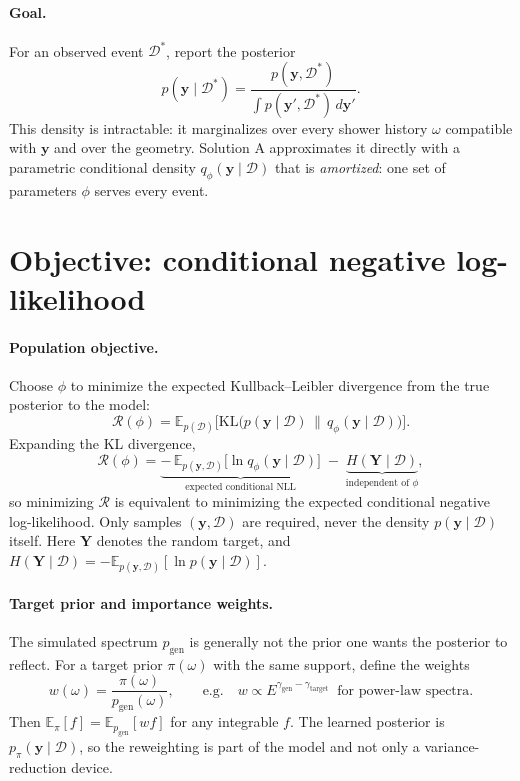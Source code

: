 \documentclass[11pt]{article}
\theoremstyle{definition}
\newcommand{\D}{\mathcal{D}}
\newcommand{\y}{\bm{y}}
\newcommand{\Y}{\bm{Y}}
\newcommand{\E}{\mathbb{E}}
\newcommand{\KL}{\mathrm{KL}}
\begin{document}
\paragraph{Goal.}
For an observed event $\D^\ast$, report the posterior
\begin{equation}
  p(\y\mid\D^\ast) = \frac{p(\y,\D^\ast)}{\int p(\y',\D^\ast)\,d\y'} .
\end{equation}
This density is intractable: it marginalizes over every shower history $\omega$ compatible
with $\y$ and over the geometry. Solution A approximates it directly with a parametric
conditional density $q_\phi(\y\mid\D)$ that is \emph{amortized}: one set of parameters $\phi$
serves every event.

\section{Objective: conditional negative log-likelihood}

\paragraph{Population objective.}
Choose $\phi$ to minimize the expected Kullback--Leibler divergence from the true posterior
to the model:
\begin{equation}
  \mathcal{R}(\phi) = \E_{p(\D)}\Big[\KL\big(p(\y\mid\D)\,\big\|\,q_\phi(\y\mid\D)\big)\Big].
\end{equation}
Expanding the KL divergence,
\begin{equation}
  \mathcal{R}(\phi)
  = \underbrace{-\,\E_{p(\y,\D)}\big[\ln q_\phi(\y\mid\D)\big]}_{\text{expected conditional NLL}}
  \;-\;\underbrace{H(\Y\mid\D)}_{\text{independent of }\phi},
  \label{eq:kl}
\end{equation}
so minimizing $\mathcal{R}$ is equivalent to minimizing the expected conditional negative
log-likelihood. Only samples $(\y,\D)$ are required, never the density $p(\y\mid\D)$ itself.
Here $\Y$ denotes the random target, and $H(\Y\mid\D) = -\E_{p(\y,\D)}[\ln p(\y\mid\D)]$.

\paragraph{Target prior and importance weights.}
The simulated spectrum $p_{\text{gen}}$ is generally not the prior one wants the posterior to
reflect. For a target prior $\pi(\omega)$ with the same support, define the weights
\begin{equation}
  w(\omega) = \frac{\pi(\omega)}{p_{\text{gen}}(\omega)},
  \qquad\text{e.g.}\quad w \propto E^{\gamma_{\text{gen}}-\gamma_{\text{target}}}
  \ \text{ for power-law spectra.}
\end{equation}
Then $\E_\pi[f] = \E_{p_{\text{gen}}}[w f]$ for any integrable $f$. The learned posterior is
$p_\pi(\y\mid\D)$, so the reweighting is part of the model and not only a variance-reduction
device.
\end{document}
